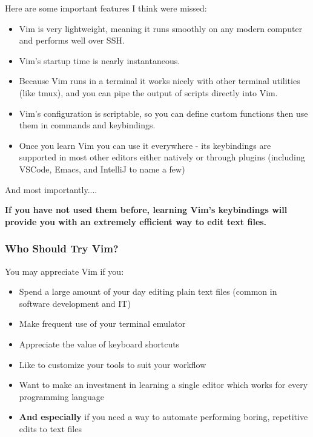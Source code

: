 \documentclass{beamer}
\begin{document}
\begin{frame}[fragile]
    \centerline{\large Here are some important features I think were missed:}
    \vspace{0.5cm}
    \small
    \begin{itemize}
	\item Vim is very lightweight, meaning it runs smoothly on any modern computer and performs well over SSH.
	\item Vim's startup time is nearly instantaneous.
	\item Because Vim runs in a terminal it works nicely with other terminal utilities (like tmux), and you can pipe the output of scripts directly into Vim.
	\item Vim's configuration is scriptable, so you can define custom functions then use them in commands and keybindings.
	\item Once you learn Vim you can use it everywhere - its keybindings are supported in most other editors either natively or through plugins (including VSCode, Emacs, and IntelliJ to name a few)
    \end{itemize}
\end{frame}

\begin{frame}[fragile]
    \centerline{\large And most importantly....}
    \vspace{0.5cm}
    \small \textbf{If you have not used them before, learning Vim's keybindings will provide you with an extremely efficient way to edit text files.}\\
\end{frame}

\begin{frame}[fragile]
    \frametitle{Who Should Try Vim?}
    \centerline{\large You may appreciate Vim if you:}
    \vspace{0.5cm}
    \begin{itemize}
	\item Spend a large amount of your day editing plain text files (common in software development and IT)
	\item Make frequent use of your terminal emulator
	\item Appreciate the value of keyboard shortcuts
	\item Like to customize your tools to suit your workflow
	\item Want to make an investment in learning a single editor which works for every programming language
	\item \textbf{And especially} if you need a way to automate performing boring, repetitive edits to text files
    \end{itemize}
\end{frame}
\end{document}
